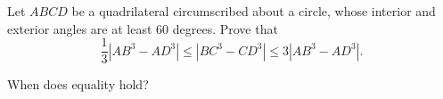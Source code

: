Let $ABCD$ be a quadrilateral circumscribed about a circle, whose interior and exterior angles are at least 60 degrees. Prove that\[ 
\frac{1}{3}|AB^3 - AD^3| \le |BC^3 - CD^3| \le 3|AB^3 - AD^3|. 
\]

When does equality hold?
